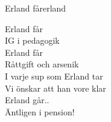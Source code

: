 \begin{song}{Erland får}{erland}
\begin{vers}
Erland får\\
IG i pedagogik\\
Erland får\\
Råttgift och arsenik\\
I varje sup som Erland tar\\
Vi önskar att han vore klar\\
Erland går..\\
Äntligen i pension!\\
\end{vers}
\end{song}
